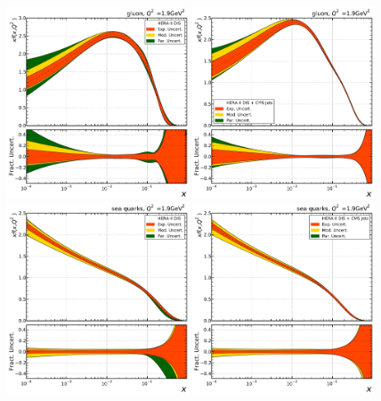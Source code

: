 \begin{figure}[tbp]
  \centering
  \includegraphics[width=0.48\textwidth]{figures/pdf_constraints/hftd/HFTD_HERA_V017_EIG/pdfratio/HFTD_HERA_V017_EIG_0_1_9.pdf}\hfill%
  \includegraphics[width=0.48\textwidth]{figures/pdf_constraints/hftd/HFTD_HERACMSTDJETS_V017_EIG/pdfratio/HFTD_HERACMSTDJETS_V017_EIG_0_1_9.pdf}
  \includegraphics[width=0.48\textwidth]{figures/pdf_constraints/hftd/HFTD_HERA_V017_EIG/pdfratio/HFTD_HERA_V017_EIG_9_1_9.pdf}\hfill%
  \includegraphics[width=0.48\textwidth]{figures/pdf_constraints/hftd/HFTD_HERACMSTDJETS_V017_EIG/pdfratio/HFTD_HERACMSTDJETS_V017_EIG_9_1_9.pdf}

\end{figure}
